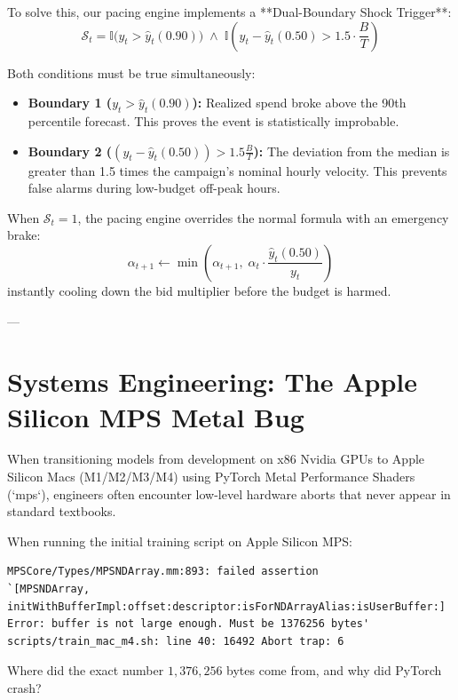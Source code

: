 \documentclass[11pt,a4paper]{article}
\begin{document}
To solve this, our pacing engine implements a **Dual-Boundary Shock Trigger**:
\begin{equation}
    \mathcal{S}_t = \mathbb{I}\Big( y_t > \hat{y}_t(0.90) \Big) \;\land\; \mathbb{I}\left( y_t - \hat{y}_t(0.50) > 1.5 \cdot \frac{B}{T} \right)
\end{equation}

Both conditions must be true simultaneously:
\begin{itemize}
    \item \textbf{Boundary 1 ($y_t > \hat{y}_t(0.90)$):} Realized spend broke above the 90th percentile forecast. This proves the event is statistically improbable.
    \item \textbf{Boundary 2 ($(y_t - \hat{y}_t(0.50)) > 1.5 \frac{B}{T}$):} The deviation from the median is greater than 1.5 times the campaign's nominal hourly velocity. This prevents false alarms during low-budget off-peak hours.
\end{itemize}

When $\mathcal{S}_t = 1$, the pacing engine overrides the normal formula with an emergency brake:
\begin{equation}
    \alpha_{t+1} \leftarrow \min\left(\alpha_{t+1}, \; \alpha_t \cdot \frac{\hat{y}_t(0.50)}{y_t}\right)
\end{equation}
instantly cooling down the bid multiplier before the budget is harmed.

---

\section{Systems Engineering: The Apple Silicon MPS Metal Bug}

When transitioning models from development on x86 Nvidia GPUs to Apple Silicon Macs (M1/M2/M3/M4) using PyTorch Metal Performance Shaders (`mps`), engineers often encounter low-level hardware aborts that never appear in standard textbooks.

\begin{warningbox}
When running the initial training script on Apple Silicon MPS:
\begin{verbatim}
MPSCore/Types/MPSNDArray.mm:893: failed assertion 
`[MPSNDArray, initWithBufferImpl:offset:descriptor:isForNDArrayAlias:isUserBuffer:] 
Error: buffer is not large enough. Must be 1376256 bytes'
scripts/train_mac_m4.sh: line 40: 16492 Abort trap: 6
\end{verbatim}
Where did the exact number $1,376,256$ bytes come from, and why did PyTorch crash?
\end{warningbox}
\end{document}
